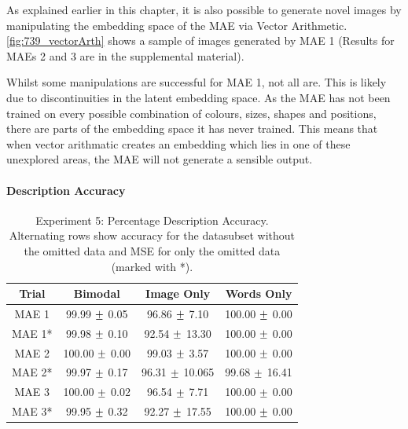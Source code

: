 As explained earlier in this chapter, it is also possible to generate novel images by manipulating the embedding space of the \ac{MAE} via Vector Arithmetic. \autoref{fig:739_vectorArth} shows a sample of images generated by \ac{MAE} 1 (Results for \acp{MAE} 2 and 3 are in the supplemental material).

Whilst some manipulations are successful for \ac{MAE} 1, not all are. This is likely due to discontinuities in the latent embedding space. As the \ac{MAE} has not been trained on every possible combination of colours, sizes, shapes and positions, there are parts of the embedding space it has never trained. This means that when vector arithmatic creates an embedding which lies in one of these unexplored areas, the \ac{MAE} will not generate a sensible output. 


\paragraph{Description Accuracy}
\begin{table}[h!]
\centering
	\begin{tabular}{|c|c|c|c|}
	\hline
\textbf{Trial}	 & 	\textbf{Bimodal} & \textbf{Image Only} 	& 	\textbf{Words Only} \\ \hline
MAE 1	&	99.99	$\mypm$	0.05	&	96.86	$\mypm$	7.10	&	100.00	$\mypm$	0.00	\\ \hline
MAE 1*	&	99.98	$\mypm$	0.10	&	92.54	$\mypm$	13.30	&	100.00	$\mypm$	0.00	\\ \hline
MAE 2	&	100.00	$\mypm$	0.00	&	99.03	$\mypm$	3.57	&	100.00	$\mypm$	0.00	\\ \hline
MAE 2*	&	99.97	$\mypm$	0.17	&	96.31	$\mypm$	10.065	&	99.68	$\mypm$	16.41	\\ \hline
MAE 3	&	100.00	$\mypm$	0.02	&	96.54	$\mypm$	7.71	&	100.00	$\mypm$	0.00	\\ \hline

MAE 3*	&	99.95	$\mypm$	0.32	&	92.27	$\mypm$	17.55	&	100.00	$\mypm$	0.00	\\ \hline

	\end{tabular}
\caption{Experiment 5: Percentage Description Accuracy. Alternating rows show accuracy for the datasubset without the omitted data and MSE for only the omitted data (marked with *).}
\label{tab:res_exp5_acc}
\end{table}

